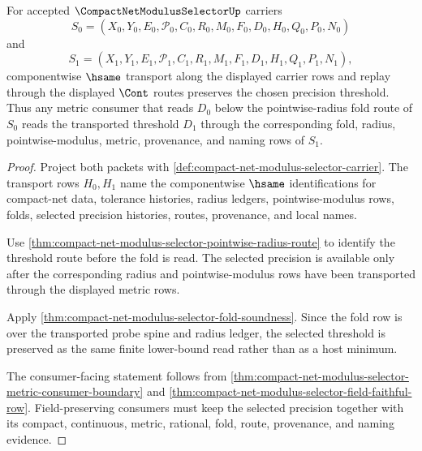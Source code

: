 \begin{theorem}
\label{thm:compact-net-modulus-selector-metric-threshold-stability}
For accepted $\CompactNetModulusSelectorUp$ carriers
$$
S_0=(X_0,Y_0,E_0,\mathcal{P}_0,C_0,R_0,M_0,F_0,D_0,H_0,Q_0,P_0,N_0)
$$
and
$$
S_1=(X_1,Y_1,E_1,\mathcal{P}_1,C_1,R_1,M_1,F_1,D_1,H_1,Q_1,P_1,N_1),
$$
componentwise $\hsame$ transport along the displayed carrier rows and replay through the displayed $\Cont$ routes preserves the chosen precision threshold. Thus any metric consumer that reads $D_0$ below the pointwise-radius fold route of $S_0$ reads the transported threshold $D_1$ through the corresponding fold, radius, pointwise-modulus, metric, provenance, and naming rows of $S_1$.
\end{theorem}
\begin{proof}
Project both packets with \autoref{def:compact-net-modulus-selector-carrier}. The transport rows $H_0,H_1$ name the componentwise $\hsame$ identifications for compact-net data, tolerance histories, radius ledgers, pointwise-modulus rows, folds, selected precision histories, routes, provenance, and local names.

Use \autoref{thm:compact-net-modulus-selector-pointwise-radius-route} to identify the threshold route before the fold is read. The selected precision is available only after the corresponding radius and pointwise-modulus rows have been transported through the displayed metric rows.

Apply \autoref{thm:compact-net-modulus-selector-fold-soundness}. Since the fold row is over the transported probe spine and radius ledger, the selected threshold is preserved as the same finite lower-bound read rather than as a host minimum.

The consumer-facing statement follows from \autoref{thm:compact-net-modulus-selector-metric-consumer-boundary} and \autoref{thm:compact-net-modulus-selector-field-faithful-row}. Field-preserving consumers must keep the selected precision together with its compact, continuous, metric, rational, fold, route, provenance, and naming evidence.
\end{proof}

